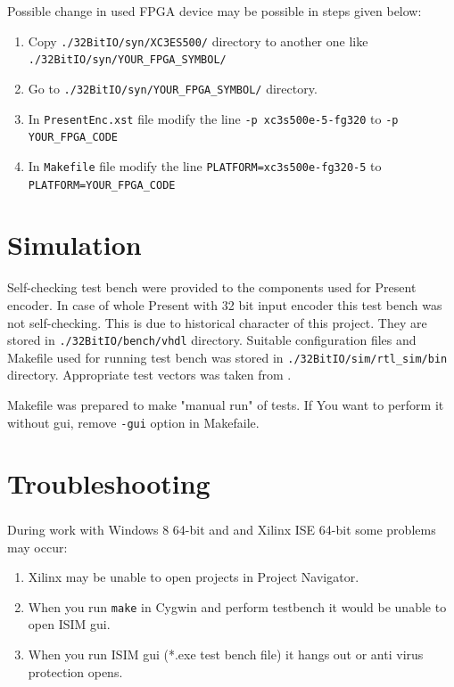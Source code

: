 \documentclass{gajewski}
\begin{document}
Possible change in used FPGA device may be possible in steps given below\footnotemark[1]:
\begin{enumerate}
    \item Copy \texttt{./32BitIO/syn/XC3ES500/} directory to another one like \texttt{./32BitIO/syn/YOUR\_FPGA\_SYMBOL/}
    \item Go to \texttt{./32BitIO/syn/YOUR\_FPGA\_SYMBOL/}  directory.
    \item In \texttt{PresentEnc.xst} file modify the line \texttt{-p xc3s500e-5-fg320} to \texttt{-p YOUR\_FPGA\_CODE}
    \item In \texttt{Makefile} file modify the line \texttt{PLATFORM=xc3s500e-fg320-5} to \texttt{PLATFORM=YOUR\_FPGA\_CODE}
\end{enumerate}


\newpage

\section{Simulation}

Self-checking test bench were provided to the components used for Present encoder. In case of whole Present with 32 bit input encoder this test bench was not self-checking. This is due to historical character of this project. They are stored in \texttt{./32BitIO/bench/vhdl} directory. Suitable configuration files and Makefile used for running test bench was stored in 
\texttt{./32BitIO/sim/rtl\_sim/bin} directory. Appropriate test vectors was taken from \cite{PRESENT}.

Makefile was prepared to make "manual run" of tests. If You want to perform it without gui, remove \texttt{-gui} option in Makefaile.

\newpage

\section{Troubleshooting}

During work with Windows 8 64-bit and and Xilinx\textsuperscript{\textregistered} ISE 64-bit some problems may occur:

\begin{enumerate}
    \item Xilinx may be unable to open projects in Project Navigator.
    \item When you run \texttt{make} in Cygwin and perform testbench it would be unable to open ISIM gui.
    \item When you run ISIM gui  (*.exe test bench file) it hangs out or anti virus protection opens.
\end{enumerate}
\end{document}
